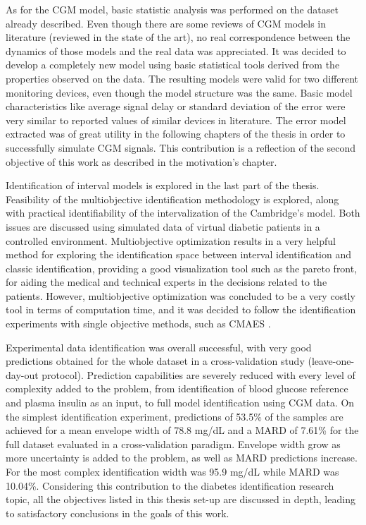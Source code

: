 As for the CGM model, basic statistic analysis was performed on the dataset already described. Even though there are some reviews of CGM models in literature (reviewed in the state of the art), no real correspondence between the dynamics of those models and the real data was appreciated. It was decided to develop a completely new model using basic statistical tools derived from the properties observed on the data. The resulting models were valid for two different monitoring devices, even though the model structure was the same. Basic model characteristics like average signal delay or standard deviation of the error were very similar to reported values of similar devices in literature. The error model extracted was of great utility in the following chapters of the thesis in order to successfully simulate CGM signals. This contribution is a reflection of the second objective of this work as described in the motivation's chapter.

Identification of interval models is explored in the last part of the thesis. Feasibility of the multiobjective identification methodology is explored, along with practical identifiability of the intervalization of the Cambridge's model. Both issues are discussed using simulated data of virtual diabetic patients in a controlled environment. Multiobjective optimization results in a very helpful method for exploring the identification space between interval identification and classic identification, providing a good visualization tool such as the pareto front, for aiding the medical and technical experts in the decisions related to the patients. However, multiobjective optimization was concluded to be a very costly tool in terms of computation time, and it was decided to follow the identification experiments with single objective methods, such as CMAES \cite{hansen2006cma,hansen2004evaluating}.

Experimental data identification was overall successful, with very good predictions obtained for the whole dataset in a cross-validation study (leave-one-day-out protocol). Prediction capabilities are severely reduced with every level of complexity added to the problem, from identification of blood glucose reference and plasma insulin as an input, to full model identification using CGM data. On the simplest identification experiment, predictions of 53.5\% of the samples are achieved for a mean envelope width of 78.8 mg/dL and a MARD of 7.61\% for the full dataset evaluated in a cross-validation paradigm. Envelope width grow as more uncertainty is added to the problem, as well as MARD predictions increase. For the most complex identification width was 95.9 mg/dL while MARD was 10.04\%. Considering this contribution to the diabetes identification research topic, all the objectives listed in this thesis set-up are discussed in depth, leading to satisfactory conclusions in the goals of this work.

